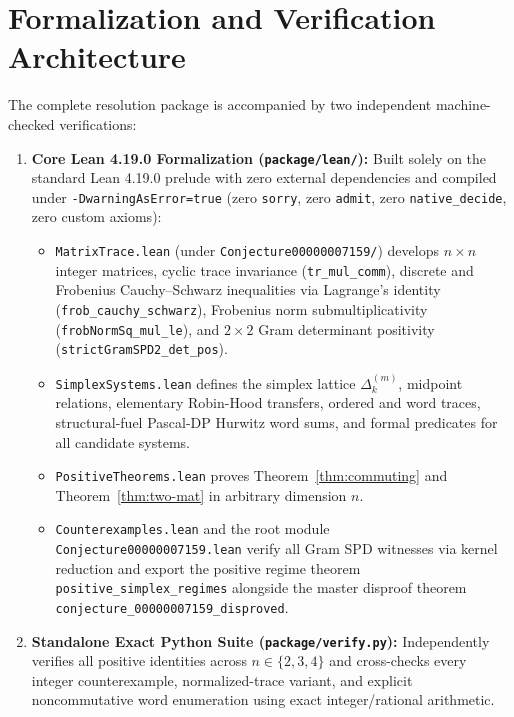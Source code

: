 \documentclass[11pt,a4paper]{article}
\theoremstyle{definition}
\theoremstyle{remark}
\newcommand{\DeltaLat}{\Delta}
\begin{document}
\section{Formalization and Verification Architecture}

{\sloppy
The complete resolution package is accompanied by two independent machine-checked verifications:
\begin{enumerate}
\item \textbf{Core Lean 4.19.0 Formalization (\texttt{package/lean/}):} Built solely on the standard Lean 4.19.0 prelude with zero external dependencies and compiled under \texttt{-DwarningAsError=true} (zero \texttt{sorry}, zero \texttt{admit}, zero \texttt{native\_decide}, zero custom axioms):
  \begin{itemize}
  \item \texttt{MatrixTrace.lean} (under \texttt{Conjecture00000007159/}) develops $n \times n$ integer matrices, cyclic trace invariance (\texttt{tr\_mul\_comm}), discrete and Frobenius Cauchy--Schwarz inequalities via Lagrange's identity (\texttt{frob\_cauchy\_schwarz}), Frobenius norm submultiplicativity (\texttt{frobNormSq\_mul\_le}), and $2 \times 2$ Gram determinant positivity (\texttt{strictGramSPD2\_det\_pos}).
  \item \texttt{SimplexSystems.lean} defines the simplex lattice $\DeltaLat_k^{(m)}$, midpoint relations, elementary Robin-Hood transfers, ordered and word traces, structural-fuel Pascal-DP Hurwitz word sums, and formal predicates for all candidate systems.
  \item \texttt{PositiveTheorems.lean} proves Theorem~\ref{thm:commuting} and Theorem~\ref{thm:two-mat} in arbitrary dimension $n$.
  \item \texttt{Counterexamples.lean} and the root module \texttt{Conjecture00000007159.lean} verify all Gram SPD witnesses via kernel reduction and export the positive regime theorem \texttt{positive\_simplex\_regimes} alongside the master disproof theorem \texttt{conjecture\_00000007159\_disproved}.
  \end{itemize}
\item \textbf{Standalone Exact Python Suite (\texttt{package/verify.py}):} Independently verifies all positive identities across $n \in \{2,3,4\}$ and cross-checks every integer counterexample, normalized-trace variant, and explicit noncommutative word enumeration using exact integer/rational arithmetic.
\end{enumerate}
\par}
\end{document}
